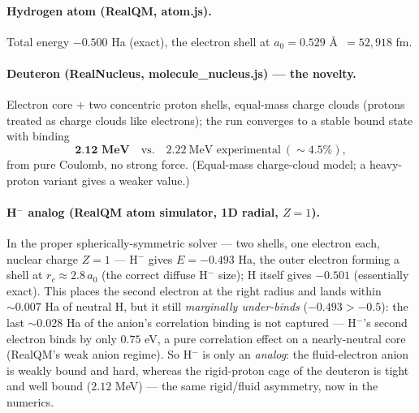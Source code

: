 \documentclass[11pt]{article}
\begin{document}
\paragraph{Hydrogen atom (RealQM, atom.js).} Total energy $\mathbf{-0.500}$ Ha (exact), the electron shell at
$a_0=0.529$ \AA\ $=52{,}918$ fm.

\paragraph{Deuteron (RealNucleus, molecule\_nucleus.js) --- the novelty.} Electron core $+$ two concentric
proton shells, equal-mass charge clouds (protons treated as charge clouds like electrons); the run converges
to a stable bound state with binding
\[ \textbf{2.12 MeV} \quad\text{vs.}\quad 2.22\ \text{MeV experimental}\ (\sim4.5\%), \]
from pure Coulomb, no strong force. (Equal-mass charge-cloud model; a heavy-proton variant gives a weaker
value.)

\paragraph{H$^-$ analog (RealQM atom simulator, 1D radial, $Z=1$).} In the proper spherically-symmetric
solver --- two shells, one electron each, nuclear charge $Z=1$ --- H$^-$ gives $E=-0.493$ Ha, the outer
electron forming a shell at $r_c\approx2.8\,a_0$ (the correct diffuse H$^-$ size); H itself gives $-0.501$
(essentially exact). This places the second electron at the right radius and lands within ${\sim}0.007$ Ha of
neutral H, but it still \emph{marginally under-binds} ($-0.493>-0.5$): the last ${\sim}0.028$ Ha of the
anion's correlation binding is not captured --- H$^-$'s second electron binds by only $0.75$ eV, a pure
correlation effect on a nearly-neutral core (RealQM's weak anion regime). So H$^-$ is only an \emph{analog}:
the fluid-electron anion is weakly bound and hard, whereas the rigid-proton cage of the deuteron is tight and
well bound ($2.12$ MeV) --- the same rigid/fluid asymmetry, now in the numerics.
\end{document}
